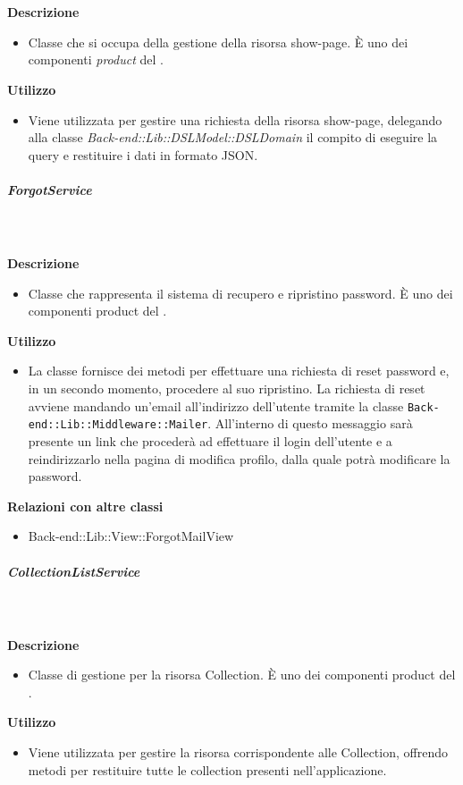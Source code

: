 				\textbf{\\ \\ Descrizione} 
					\begin{itemize}
						\item[] Classe che si occupa della gestione della risorsa show-page. È uno dei componenti \textit{product} del  .
					\end{itemize}      
				\textbf{Utilizzo}  
					\begin{itemize}
						\item[] Viene utilizzata per gestire una richiesta della risorsa show-page, delegando alla classe \textit{Back-end::Lib::DSLModel::DSLDomain} il compito di eseguire la query e restituire i dati in formato JSON.
					\end{itemize}
			\subparagraph{ForgotService}
				
				\textbf{\\ \\ Descrizione} 
					\begin{itemize}
						\item[] Classe che rappresenta il sistema di recupero e ripristino password. È uno dei componenti product del  .
					\end{itemize}      
				\textbf{Utilizzo}  
					\begin{itemize}
						\item[] La classe fornisce dei metodi per effettuare una richiesta di reset password e, in un secondo momento, procedere al suo ripristino. La richiesta di reset avviene mandando un'email all'indirizzo dell'utente tramite la classe \texttt{Back-end::Lib::Middleware::Mailer}. All'interno di questo messaggio sarà presente un link che procederà ad effettuare il login dell'utente e a reindirizzarlo nella pagina di modifica profilo, dalla quale potrà modificare la password.
					\end{itemize}
					\textbf{Relazioni con altre classi}
					\begin{itemize}
							\item{Back-end::Lib::View::ForgotMailView}
					\end{itemize}
			\subparagraph{CollectionListService}
				
				\textbf{\\ \\ Descrizione} 
					\begin{itemize}
						\item[] Classe di gestione per la risorsa Collection. È uno dei componenti product del  .
					\end{itemize}      
				\textbf{Utilizzo}  
					\begin{itemize}
						\item[] Viene utilizzata per gestire la risorsa corrispondente alle Collection, offrendo metodi per restituire tutte le collection presenti nell'applicazione.
					\end{itemize}
